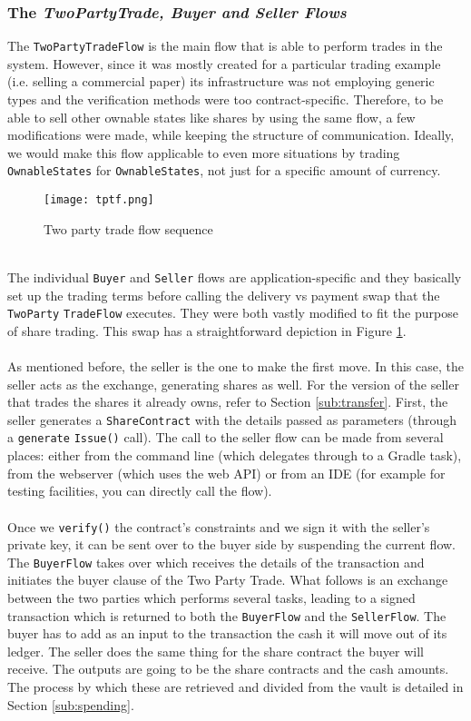 \documentclass[12pt,twoside]{article}
\begin{document}
\subsubsection{The \textit{TwoPartyTrade, Buyer and Seller Flows}}
The \verb|TwoPartyTradeFlow| is the main flow that is able to perform trades in the system. However, since it was mostly created for a particular trading example (i.e. selling a commercial paper) its infrastructure was not employing generic types and the verification methods were too contract-specific. Therefore, to be able to sell other ownable states like shares by using the same flow, a few modifications were made, while keeping the structure of communication. Ideally, we would make this flow applicable to even more situations by trading \verb|OwnableStates| for \verb|OwnableStates|, not just for a specific amount of currency.
\\
\begin{figure}[!htb]
\centering
\texttt{[image: tptf.png]}
\caption{Two party trade flow sequence}
\centering
\label{fig:2ptf}
\end{figure}
\\
The individual \verb|Buyer| and \verb|Seller| flows are application-specific and they basically set up the trading terms before calling the delivery vs payment swap that the \verb|TwoParty| \verb|TradeFlow| executes. They were both vastly modified to fit the purpose of share trading. This swap has a straightforward depiction in Figure \ref{fig:2ptf}. 
\\ \\
As mentioned before, the seller is the one to make the first move. In this case, the seller acts as the exchange, generating shares as well. For the version of the seller that trades the shares it already owns, refer to Section \ref{sub:transfer}. First, the seller generates a \verb|ShareContract| with the details passed as parameters (through a \verb|generate| \verb|Issue()| call). The call to the seller flow can be made from several places: either from the command line (which delegates through to a Gradle task), from the webserver (which uses the web API) or from an IDE (for example for testing facilities, you can directly call the flow). 
\\ \\
Once we \verb|verify()| the contract's constraints and we sign it with the seller's private key, it can be sent over to the buyer side by suspending the current flow. The \verb|BuyerFlow| takes over which receives the details of the transaction and initiates the buyer clause of the Two Party Trade. What follows is an exchange between the two parties which performs several tasks, leading to a signed transaction which is returned to both the \verb|BuyerFlow| and the \verb|SellerFlow|. The buyer has to add as an input to the transaction the cash it will move out of its ledger. The seller does the same thing for the share contract the buyer will receive. The outputs are going to be the share contracts and the cash amounts. The process by which these are retrieved and divided from the vault is detailed in Section \ref{sub:spending}. 
\end{document}

